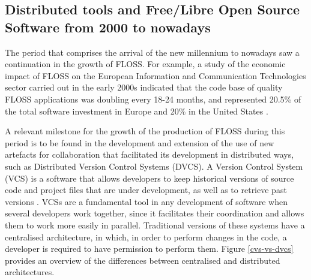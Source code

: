 \subsection{Distributed tools and Free/Libre Open Source Software from 2000 to nowadays}
\label{subsec:floss-tools}

The period that comprises the arrival of the new millennium to nowadays saw a continuation in the growth of FLOSS. For example, a study of the economic impact of FLOSS on the European Information and Communication Technologies sector carried out in the early 2000s indicated that the code base of quality FLOSS applications was doubling every 18-24 months, and represented 20.5\% of the total software investment in Europe and 20\% in the United States \parencite{ghosh2007economic}.

A relevant milestone for the growth of the production of FLOSS during this period is to be found in the development and extension of the use of new artefacts for collaboration that facilitated its development in distributed ways, such as Distributed Version Control Systems (DVCS). A Version Control System (VCS) is a software that allows developers to keep historical versions of source code and project files that are under development, as well as to retrieve past versions \parencite{ruparelia2010history}. VCSs are a fundamental tool in any development of software when several developers work together, since it facilitates their coordination and allows them to work more easily in parallel. Traditional versions of these systems have a centralised architecture, in which, in order to perform changes in the code, a developer is required to have permission to perform them. Figure \ref{cvs-vs-dvcs} provides an overview of the differences between centralised and distributed architectures.

